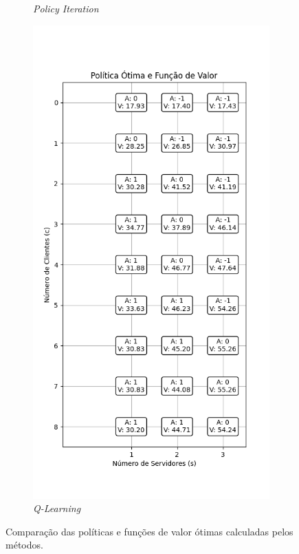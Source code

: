 \begin{figure}[H]
\begin{subfigure}{0.3\textwidth}
        \caption{\textit{Policy Iteration}}
    \end{subfigure}
    \begin{subfigure}{0.3\textwidth}
        \centering
        \includegraphics[width=\linewidth]{fig/q_learning_policy_and_values.png}
        \caption{\textit{Q-Learning}}
    \end{subfigure}
    \caption{Comparação das políticas e funções de valor ótimas calculadas pelos métodos.}
    \label{fig:comparison}
\end{figure}



